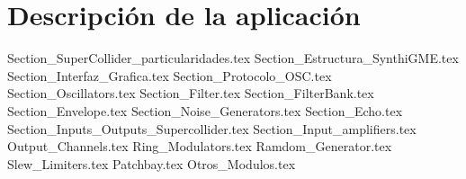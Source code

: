 \chapter{Descripción de la aplicación}


	{Section_SuperCollider_particularidades.tex} 
	{Section_Estructura_SynthiGME.tex} 
	{Section_Interfaz_Grafica.tex} 
	{Section_Protocolo_OSC.tex} 
	{Section_Oscillators.tex} 
	{Section_Filter.tex}	 
	{Section_FilterBank.tex}	 
	{Section_Envelope.tex}	 
	{Section_Noise_Generators.tex} 
	{Section_Echo.tex} 
	{Section_Inputs_Outputs_Supercollider.tex} 
	{Section_Input_amplifiers.tex} 
	{Output_Channels.tex} 
	{Ring_Modulators.tex} 
	{Ramdom_Generator.tex} 
	{Slew_Limiters.tex} 
	{Patchbay.tex} 
	{Otros_Modulos.tex} 